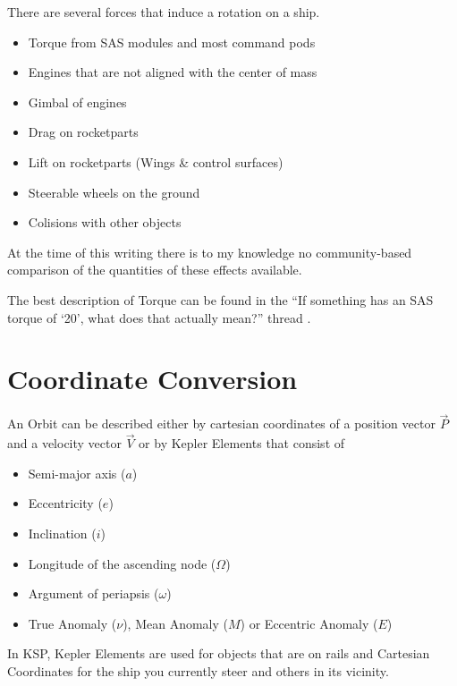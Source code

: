 \documentclass[11pt]{report}
\newcommand{\oa}[1]{\overrightarrow{#1}}
\newcommand{\Pos}{\oa{P}}
\newcommand{\Vel}{\oa{V}}
\begin{document}
There are several forces that induce a rotation on a ship.

\begin{itemize}
\item {} Torque from SAS modules and most command pods
\item Engines that are not aligned with the center of mass
\item {} Gimbal of engines
\item Drag on rocketparts
\item Lift on rocketparts (Wings \& control surfaces)
\item Steerable wheels on the ground
\item Colisions with other objects
\end{itemize}

At the time of this writing there is to my knowledge no
community-based comparison of the quantities of these effects
available.

The best description of Torque can be found in the ``If something has
an SAS torque of `20', what does that actually mean?'' thread
\cite{torque}.

\chapter{Coordinate Conversion}

An  Orbit can be described either by  cartesian coordinates of a position vector $\Pos$ and a
velocity vector $\Vel$ or by  Kepler Elements
\cite{Kepler} that consist of

\begin{itemize}
\item {} Semi-major axis ($a$)
\item {} Eccentricity ($e$)
\item {} Inclination ($i$)
\item {} Longitude of the ascending node ($\Omega$)
\item {} Argument of periapsis ($\omega$)
\item True Anomaly ($\nu$), Mean Anomaly ($M$) or Eccentric Anomaly ($E$)
\end{itemize}

In KSP, Kepler Elements are used for objects that are on rails and
Cartesian Coordinates for the ship you currently steer and others in
its vicinity.
\end{document}
